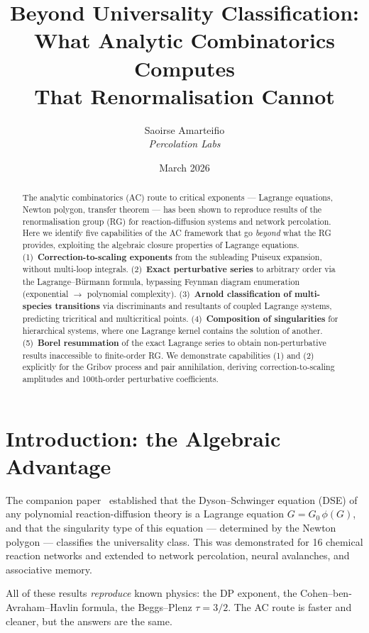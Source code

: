 \documentclass[11pt,a4paper]{article}
\title{%
\textbf{Beyond Universality Classification}:\\[0.4em]
\large What Analytic Combinatorics Computes\\
That Renormalisation Cannot
}
\author{
Saoirse Amarteifio\\
\small \textit{Percolation Labs}
}
\date{March 2026}
\theoremstyle{definition}
\begin{document}
\maketitle

\begin{abstract}
The analytic combinatorics (AC) route to critical exponents ---
Lagrange equations, Newton polygon, transfer theorem --- has been
shown to reproduce results of the renormalisation group (RG) for
reaction-diffusion systems and network percolation. Here we identify
five capabilities of the AC framework that go \emph{beyond} what the
RG provides, exploiting the algebraic closure properties of Lagrange
equations. (1)~\textbf{Correction-to-scaling exponents} from the
subleading Puiseux expansion, without multi-loop integrals.
(2)~\textbf{Exact perturbative series} to arbitrary order via the
Lagrange--B\"urmann formula, bypassing Feynman diagram enumeration
(exponential $\to$ polynomial complexity). (3)~\textbf{Arnold
classification of multi-species transitions} via discriminants and
resultants of coupled Lagrange systems, predicting tricritical and
multicritical points. (4)~\textbf{Composition of singularities} for
hierarchical systems, where one Lagrange kernel contains the solution
of another. (5)~\textbf{Borel resummation} of the exact Lagrange
series to obtain non-perturbative results inaccessible to finite-order
RG. We demonstrate capabilities (1) and (2) explicitly for the Gribov
process and pair annihilation, deriving correction-to-scaling amplitudes
and 100th-order perturbative coefficients.
\end{abstract}

\tableofcontents
\clearpage


\section{Introduction: the Algebraic Advantage}
\label{sec:intro}

The companion paper~\cite{amarteifio2026rdft} established that the
Dyson--Schwinger equation (DSE) of any polynomial reaction-diffusion
theory is a Lagrange equation $G = G_0\,\phi(G)$, and that the
singularity type of this equation --- determined by the Newton
polygon --- classifies the universality class. This was demonstrated
for 16 chemical reaction networks and extended to network percolation,
neural avalanches, and associative memory.

All of these results \emph{reproduce} known physics: the DP exponent,
the Cohen--ben-Avraham--Havlin formula, the Beggs--Plenz $\tau = 3/2$.
The AC route is faster and cleaner, but the answers are the same.
\end{document}
